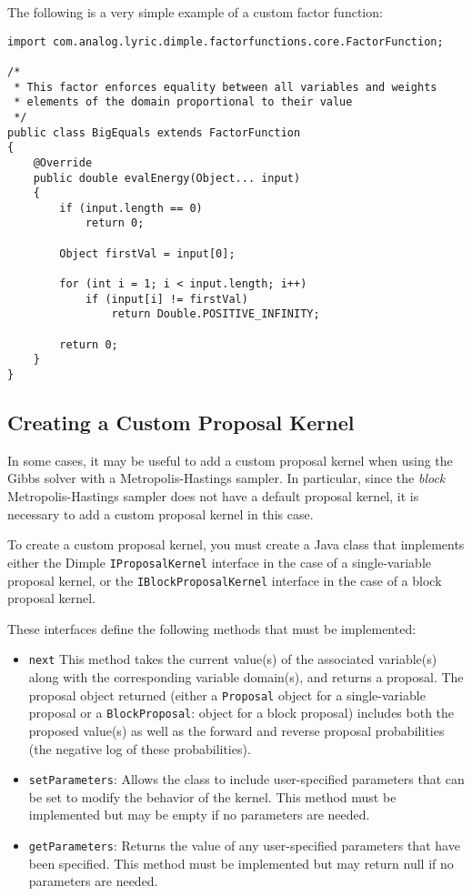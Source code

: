 The following is a very simple example of a custom factor function:

\begin{lstlisting}
import com.analog.lyric.dimple.factorfunctions.core.FactorFunction;

/*
 * This factor enforces equality between all variables and weights
 * elements of the domain proportional to their value
 */
public class BigEquals extends FactorFunction
{	
    @Override
    public double evalEnergy(Object... input)
    {
        if (input.length == 0)
            return 0;
    	
        Object firstVal = input[0];
    	
        for (int i = 1; i < input.length; i++)
            if (input[i] != firstVal)
    	        return Double.POSITIVE_INFINITY;
    	
        return 0;
    }
}
\end{lstlisting}




\subsection{Creating a Custom Proposal Kernel}
\label{sec:CreatingACustomProposalKernel}

In some cases, it may be useful to add a custom proposal kernel when using the Gibbs solver with a Metropolis-Hastings sampler.  In particular, since the \emph{block} Metropolis-Hastings sampler does not have a default proposal kernel, it is necessary to add a custom proposal kernel in this case.

To create a custom proposal kernel, you must create a Java class that implements either the Dimple \texttt{IProposalKernel} interface in the case of a single-variable proposal kernel, or the \texttt{IBlockProposalKernel} interface in the case of a block proposal kernel.

These interfaces define the following methods that must be implemented:
%
\begin{itemize}
%
\item \texttt{next} This method takes the current value(s) of the associated variable(s) along with the corresponding variable domain(s), and returns a proposal.  The proposal object returned (either a \texttt{Proposal} object for a single-variable proposal or a \texttt{BlockProposal}: object for a block proposal) includes both the proposed value(s) as well as the forward and reverse proposal probabilities (the negative log of these probabilities).
%
\item \texttt{setParameters}: Allows the class to include user-specified parameters that can be set to modify the behavior of the kernel.  This method must be implemented but may be empty if no parameters are needed.
%
\item \texttt{getParameters}: Returns the value of any user-specified parameters that have been specified.  This method must be implemented but may return null if no parameters are needed.
%
\end{itemize}


